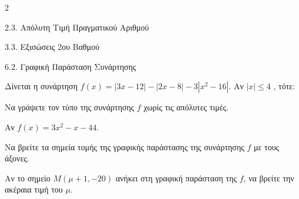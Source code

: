 \begin{ylh}{2}
    \item 2.3. Απόλυτη Τιμή Πραγματικού Αριθμού
    \item 3.3. Εξισώσεις 2ου Βαθμού
    \item 6.2. Γραφική Παράσταση Συνάρτησης
\end{ylh}
Δίνεται η συνάρτηση $f(x) = |3x - 12| - |2x - 8| - 3\left| x^{2} - 16 \right|$. Αν $|x| \leq 4$ , τότε:
\begin{alist}
\item Να γράψετε τον τύπο της συνάρτησης $f$ χωρίς τις απόλυτες τιμές.

\item Αν $f(x) = 3x^{2} - x - 44$.
\begin{rlist}
\item Να βρείτε τα σημεία τομής της γραφικής παράστασης της συνάρτησης $f$ με τους άξονες.
\item Αν το σημείο $M(\mu + 1, - 20)$ ανήκει στη γραφική παράσταση της $f$, να βρείτε την ακέραια τιμή του $\mu$.
\end{rlist}
\end{alist}


